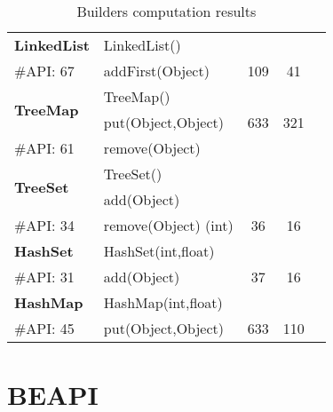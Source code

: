 \begin{table}[t!]
{\begin{tabular}{l l ccc}
\hline

\multirow{1}{*}{\textbf{LinkedList}} 
 & LinkedList()& &\\
 {\scriptsize \#API: 67}&  addFirst(Object) &109   &41 \\
 \hline

\multirow{2}{*}{\textbf{TreeMap}} 
 & TreeMap()& &\\
 & put(Object,Object) & 633 & 321 \\
{\scriptsize \#API: 61}&  remove(Object) & &\\
\hline

\multirow{2}{*}{\textbf{TreeSet}} 
 & TreeSet()& &\\
 & add(Object) &   & \\
{\scriptsize \#API: 34}&  remove(Object) (int) & 36 & 16\\
\hline

\multirow{1}{*}{\textbf{HashSet}} 
 & HashSet(int,float)& &\\
 {\scriptsize \#API: 31}&  add(Object) & 37  &16 \\
\hline

\multirow{1}{*}{\textbf{HashMap}} 
 & HashMap(int,float)& &\\
{\scriptsize \#API: 45}& put(Object,Object) &  633 &110 \\
\hline

\end{tabular}%
}

\caption{Builders computation results}
\label{tab:results-compute-bld}
\end{table}

\hspace{1cm}




\section{BEAPI}


